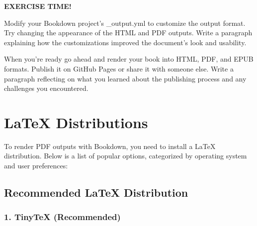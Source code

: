 \documentclass[
]{book}
\newenvironment{blackbox}{
  \definecolor{shadecolor}{rgb}{0, 0, 0}
  \color{white}
  \begin{shaded}
  }
 {\end{shaded}}
\theoremstyle{definition}
\theoremstyle{definition}
\theoremstyle{definition}
\theoremstyle{definition}
\theoremstyle{remark}
\begin{document}
\begin{blackbox}

\begin{center}
\textbf{EXERCISE TIME!}

\end{center}

Modify your Bookdown project's \_output.yml to customize the output format. Try changing the appearance of the HTML and PDF outputs. Write a paragraph explaining how the customizations improved the document's look and usability.

When you're ready go ahead and render your book into HTML, PDF, and EPUB formats. Publish it on GitHub Pages or share it with someone else. Write a paragraph reflecting on what you learned about the publishing process and any challenges you encountered.

\end{blackbox}

\chapter{LaTeX Distributions}\label{latexdistributions}

To render PDF outputs with Bookdown, you need to install a LaTeX distribution. Below is a list of popular options, categorized by operating system and user preferences:

\section{Recommended LaTeX Distribution}\label{recommended-latex-distribution}

\subsection{\texorpdfstring{1. \textbf{TinyTeX} (Recommended)}{1. TinyTeX (Recommended)}}\label{tinytex-recommended}
\end{document}
